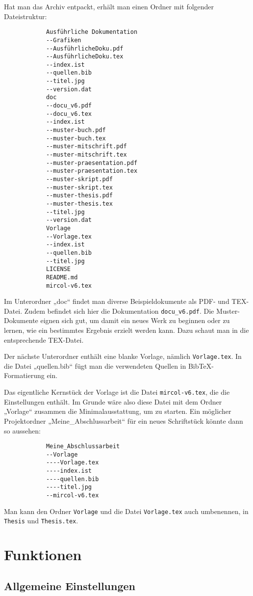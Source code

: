 			Hat man das Archiv entpackt, erhält man einen Ordner mit folgender Dateistruktur:

			\begin{verbatim}
			Ausführliche Dokumentation
			--Grafiken
			--AusführlicheDoku.pdf
			--AusführlicheDoku.tex
			--index.ist
			--quellen.bib
			--titel.jpg
			--version.dat
			doc
			--docu_v6.pdf
			--docu_v6.tex
			--index.ist
			--muster-buch.pdf
			--muster-buch.tex
			--muster-mitschrift.pdf
			--muster-mitschrift.tex
			--muster-praesentation.pdf
			--muster-praesentation.tex
			--muster-skript.pdf
			--muster-skript.tex
			--muster-thesis.pdf
			--muster-thesis.tex
			--titel.jpg
			--version.dat
			Vorlage
			--Vorlage.tex
			--index.ist
			--quellen.bib
			--titel.jpg
			LICENSE
			README.md
			mircol-v6.tex
			\end{verbatim}

			Im Unterordner „doc“ findet man diverse Beispieldokumente als PDF- und TEX-Datei. Zudem befindet sich hier die Dokumentation \texttt{docu\_v6.pdf}. Die Muster-Dokumente eignen sich gut, um damit ein neues Werk zu beginnen oder zu lernen, wie ein bestimmtes Ergebnis erzielt werden kann. Dazu schaut man in die entsprechende TEX-Datei.

			Der nächste Unterordner enthält eine blanke Vorlage, nämlich \texttt{Vorlage.tex}. In die Datei „quellen.bib“ fügt man die verwendeten Quellen in BibTeX-Formatierung ein.

			Das eigentliche Kernstück der Vorlage ist die Datei \texttt{mircol-v6.tex}, die die Einstellungen enthält. Im Grunde wäre also diese Datei mit dem Ordner „Vorlage“ zusammen die Minimalausstattung, um zu starten. Ein möglicher Projektordner „Meine\_Abschlussarbeit“ für ein neues Schriftstück könnte dann so aussehen:



			\begin{verbatim}
			Meine_Abschlussarbeit
			--Vorlage
			----Vorlage.tex
			----index.ist
			----quellen.bib
			----titel.jpg
			--mircol-v6.tex
			\end{verbatim}

			Man kann den Ordner \texttt{Vorlage} und die Datei \texttt{Vorlage.tex} auch umbenennen, \zb in \texttt{Thesis} und \texttt{Thesis.tex}.

	\chapter{Funktionen}

		\section{Allgemeine Einstellungen}

